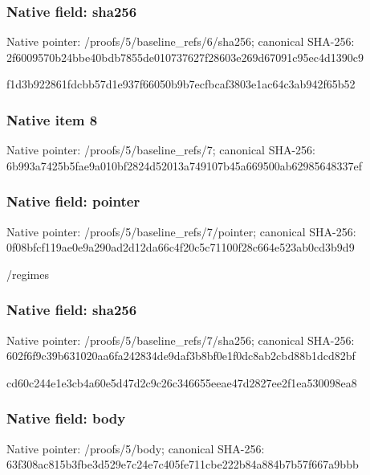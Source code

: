 \documentclass[10pt,a4paper]{article}
\begin{document}
\subsubsection{Native field: sha256}
Native pointer: /proofs/5/baseline\_\allowbreak{}refs/6/sha256; canonical SHA-256: 2f6009570b24bbe40bdb7855de010737627f28603e269d67091c95ec4d1390c9

\begingroup\raggedright\sloppy f1d3b922861fdcbb57d1e937f66050b9b7ecfbcaf3803e1ac64c3ab942f65b52\par\endgroup

\subsubsection{Native item 8}
Native pointer: /proofs/5/baseline\_\allowbreak{}refs/7; canonical SHA-256: 6b993a7425b5fae9a010bf2824d52013a749107b45a669500ab62985648337ef

\subsubsection{Native field: pointer}
Native pointer: /proofs/5/baseline\_\allowbreak{}refs/7/pointer; canonical SHA-256: 0f08bfcf119ae0e9a290ad2d12da66c4f20c5c71100f28c664e523ab0cd3b9d9

\begingroup\raggedright\sloppy /\allowbreak{}regimes\par\endgroup

\subsubsection{Native field: sha256}
Native pointer: /proofs/5/baseline\_\allowbreak{}refs/7/sha256; canonical SHA-256: 602f6f9c39b631020aa6fa242834de9daf3b8bf0e1f0dc8ab2cbd88b1dcd82bf

\begingroup\raggedright\sloppy cd60c244e1e3cb4a60e5d47d2c9c26c346655eeae47d2827ee2f1ea530098ea8\par\endgroup

\subsubsection{Native field: body}
Native pointer: /proofs/5/body; canonical SHA-256: 63f308ac815b3fbe3d529e7c24e7c405fe711cbe222b84a884b7b57f667a9bbb
\end{document}
